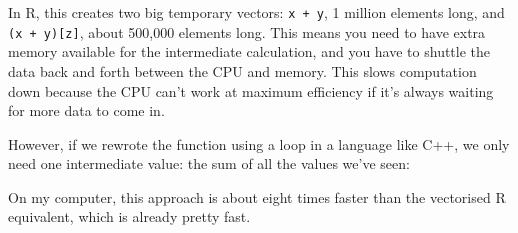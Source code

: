 In R, this creates two big temporary vectors: \texttt{x + y}, 1 million
elements long, and \texttt{(x + y){[}z{]}}, about 500,000 elements long.
This means you need to have extra memory available for the intermediate
calculation, and you have to shuttle the data back and forth between the
CPU and memory. This slows computation down because the CPU can't work
at maximum efficiency if it's always waiting for more data to come in.

However, if we rewrote the function using a loop in a language like C++,
we only need one intermediate value: the sum of all the values we've
seen:

\begin{Shaded}
\begin{Highlighting}[]
  

 
   \NormalTok{;}
   

  \NormalTok{(} 
     \NormalTok{;}
  \NormalTok{\}}

   
\NormalTok{\}}
\end{Highlighting}
\end{Shaded}

On my computer, this approach is about eight times faster than the
vectorised R equivalent, which is already pretty fast.

\begin{Shaded}
\begin{Highlighting}[]
\StringTok{ }
  \StringTok{ }
\NormalTok{\}}

\NormalTok{(}
   
\NormalTok{)}
\end{Highlighting}
\end{Shaded}

